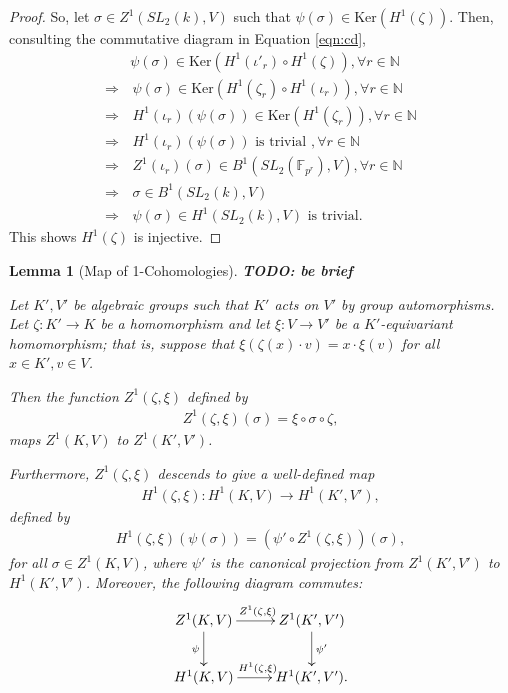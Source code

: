 \documentclass[12pt]{amsart}
\numberwithin{equation}{section}
\newtheorem{lem}[equation]{Lemma}
\theoremstyle{definition}
\theoremstyle{remark}
\theoremstyle{remark}
\begin{document}
\begin{proof}
So, let $\sigma \in Z^1(SL_2(k), V)$ such that $\psi(\sigma) \in \mathrm{Ker}\left(H^1(\zeta)\right)$.
Then, consulting the commutative diagram in Equation \ref{eqn:cd},
\begin{align*}
	&\psi(\sigma) \in \mathrm{Ker}\left(H^1(\iota'_r) \circ H^1(\zeta)\right), \forall r \in \mathbb{N} \\
	\Rightarrow &\,\psi(\sigma) \in \mathrm{Ker}\left(H^1(\zeta_r) \circ H^1(\iota_r)\right), \forall r \in \mathbb{N}  \\
	\Rightarrow &\,H^1(\iota_r)(\psi(\sigma)) \in \mathrm{Ker}\left(H^1(\zeta_r)\right), \forall r \in \mathbb{N}  \\
	\Rightarrow &\,H^1(\iota_r)(\psi(\sigma))\textrm{ is trivial }, \forall r \in \mathbb{N} \\%
	\Rightarrow &\,Z^1(\iota_r)(\sigma) \in B^1(SL_2(\mathbb{F}_{p^r}), V), \forall r \in \mathbb{N}  \\
	\Rightarrow &\,\sigma \in B^1(SL_2(k), V) \\ %
	\Rightarrow &\,\psi(\sigma) \in H^1(SL_2(k), V) \textrm{ is trivial}.
\end{align*}
This shows $H^1(\zeta)$ is injective.
\end{proof}

\begin{lem}[Map of 1-Cohomologies] \label{h1maps} \textbf{TODO: be brief}

Let $K', V'$ be algebraic groups such that $K'$ acts on $V'$ by group automorphisms.
	Let $\zeta:K' \rightarrow K$ be a homomorphism and let $\xi: V \rightarrow V'$ be a $K'$-equivariant homomorphism; that is, suppose that $\xi(\zeta(x) \cdot v) = x \cdot \xi(v)$ for all $x \in K', v \in V$.

	Then the function $Z^1(\zeta, \xi)$ defined by
	\begin{align*}
		Z^1(\zeta, \xi)(\sigma) = \xi \circ \sigma \circ \zeta,
	\end{align*}
	maps $Z^1(K, V)$ to $Z^1(K', V')$.

	Furthermore, $Z^1(\zeta, \xi)$ descends to give a well-defined map
	\begin{align*}
		H^1(\zeta, \xi):H^1(K, V) \rightarrow H^1(K', V'),
	\end{align*}
	defined by
	\begin{align*}
		H^1(\zeta, \xi)(\psi(\sigma)) = \left(\psi' \circ Z^1(\zeta, \xi)\right)(\sigma),
	\end{align*}
	for all $\sigma \in Z^1(K, V)$, where $\psi'$ is the canonical projection from $Z^1(K', V')$ to $H^1(K', V')$.
	Moreover, the following diagram commutes:
	\begin{align*}
		\xymatrix{
			Z^1(K, V) \ar[r]^{Z^1(\zeta, \xi)} \ar[d]_{\psi} & Z^1(K', V') \ar[d]^{\psi'} \\
			H^1(K, V) \ar[r]^{H^1(\zeta, \xi)}               & H^1(K', V').
		}
	\end{align*}
\end{lem}
\end{document}
